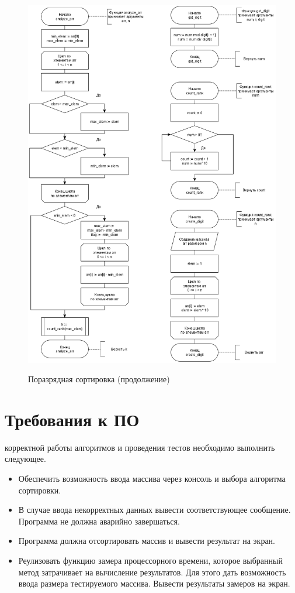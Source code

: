 \begin{figure}[h]
	\begin{center}
		{\includegraphics[scale = 0.53]{schemes/lsd_2}}
		\caption{Поразрядная сортировка (продолжение)}
		\label{fig4:image}
	\end{center}
\end{figure}


\section{Требования к ПО}
 корректной работы алгоритмов и проведения тестов необходимо выполнить следующее.
\begin{itemize}
	\item Обеспечить возможность ввода массива через консоль и выбора алгоритма сортировки.
	\item В случае ввода некорректных данных вывести соответствующее сообщение. Программа не должна аварийно завершаться.
	\item Программа должна отсортировать массив и вывести результат на экран.
	\item Реулизовать функцию замера процессорного времени, которое выбранный метод затрачивает на вычисление результатов. Для этого дать возможность ввода размера тестируемого массива. Вывести результаты замеров на экран.
\end{itemize}

